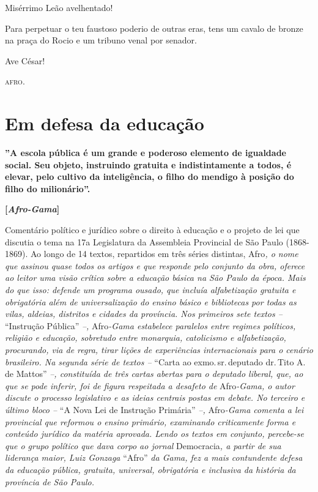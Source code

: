 Misérrimo Leão avelhentado!

Para perpetuar o teu faustoso poderio de outras eras, tens um cavalo de
bronze na praça do Rocio e um tribuno venal por senador.

Ave César!
\begin{flushright}
\textsc{afro}.
\end{flushright}

\part{Em defesa da educação} %

\textbf{''A escola pública é um grande e poderoso elemento de igualdade
social. Seu objeto, instruindo gratuita e indistintamente a todos, é
elevar, pelo cultivo da inteligência, o filho do mendigo à posição do
filho do milionário''.}

\textbf{{[}\emph{Afro-Gama}{]}}

\begin{argumento}
Comentário político e jurídico sobre o direito à educação e o projeto de
lei que discutia o tema na 17a Legislatura da Assembleia Provincial de
São Paulo (1868-1869). Ao longo de 14 textos, repartidos em três séries
distintas, Afro\emph{, o nome que assinou quase todos os artigos e que
responde pelo conjunto da obra, oferece ao leitor uma visão crítica
sobre a educação básica na São Paulo da época. Mais do que isso: defende
um programa ousado, que incluía alfabetização gratuita e obrigatória
além de universalização do ensino básico e bibliotecas por todas as
vilas, aldeias, distritos e cidades da província. Nos primeiros sete
textos --} ``Instrução Pública'' \emph{--,} Afro\emph{-Gama estabelece
paralelos entre regimes políticos, religião e educação, sobretudo entre
monarquia, catolicismo e alfabetização, procurando, via de regra, tirar
lições de experiências internacionais para o cenário brasileiro. Na
segunda série de textos --} ``Carta ao exmo.\,sr.\,deputado dr.\,Tito A. de
Mattos'' \emph{--, constituída de três cartas abertas para o deputado
liberal, que, ao que se pode inferir, foi de figura respeitada a
desafeto de} Afro\emph{-Gama, o autor discute o processo legislativo e
as ideias centrais postas em debate. No terceiro e último bloco --} ``A
Nova Lei de Instrução Primária'' \emph{--,} Afro\emph{-Gama comenta a lei
provincial que reformou o ensino primário, examinando criticamente forma
e conteúdo jurídico da matéria aprovada. Lendo os textos em conjunto,
percebe-se que o grupo político que dava corpo ao jornal}
Democracia\emph{, a partir de sua liderança maior, Luiz Gonzaga} ``Afro''
\emph{da Gama, fez a mais contundente defesa da educação pública,
gratuita, universal, obrigatória e inclusiva da história da província de
São Paulo.}
\end{argumento}

